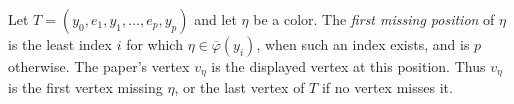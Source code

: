 \begin{definition}
Let $T=(y_0,e_1,y_1,\ldots,e_p,y_p)$ and let $\eta$ be a color.  The
\emph{first missing position} of $\eta$ is the least index $i$ for which
$\eta\in\overline\varphi(y_i)$, when such an index exists, and is $p$
otherwise.  The paper's vertex $v_\eta$ is the displayed vertex at this
position.  Thus $v_\eta$ is the first vertex missing $\eta$, or the last
vertex of $T$ if no vertex misses it.
\end{definition}
